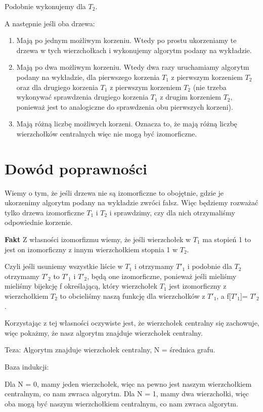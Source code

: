 \documentclass[12pt,a4paper]{article}
\begin{document}
Podobnie wykonujemy dla $T_2$.

A następnie jeśli oba drzewa:
\begin{enumerate}
    \item Mają po jednym możliwym korzeniu.
    Wtedy po prostu ukorzeniamy te drzewa w tych wierzchołkach i wykonujemy algorytm podany na wykładzie.
    \item Mają po dwa możliwym korzeniu.
    Wtedy dwa razy uruchamiamy algorytm podany na wykładzie, dla pierwszego korzenia $T_1$ z pierwszym korzeniem $T_2$ oraz dla drugiego korzenia $T_1$ z pierwszym korzeniem $T_2$ (nie trzeba wykonywać sprawdzenia drugiego korzenia $T_1$ z drugim korzeniem $T_2$, ponieważ jest to analogiczne do sprawdzenia obu pierwszych korzeni).
    \item Mają różną liczbę możliwych korzeni.
    Oznacza to, że mają różną liczbę wierzchołków centralnych więc nie mogą być izomorficzne.
\end{enumerate} 
\section{Dowód poprawności}
Wiemy o tym, że jeśli drzewa nie są izomorficzne to obojętnie, gdzie je ukorzenimy algorytm podany na wykładzie zwróci fałsz. Więc będziemy rozważać tylko drzewa izomorficzne $T_1$ i $T_2$ i sprawdzimy, czy dla nich otrzymaliśmy odpowiednie korzenie.

\textbf{Fakt} Z własności izomorfizmu wiemy, że jeśli wierzchołek w $T_1$ ma stopień 1 to jest on izomorficzny z innym wierzchołkiem stopnia 1 w $T_2$. 

Czyli jeśli usuniemy wszystkie liście w $T_1$ i otrzymamy $T'_1$ i podobnie dla $T_2$ otrzymamy $T'_2$ to $T'_1$ i $T'_2$, będą one izomorficzne, ponieważ jeśli mieliśmy mieliśmy bijekcję f określającą, który wierzchołek $T_1$ jest izomorficzny z wierzchołkiem $T_2$ to obcieliśmy naszą funkcję dla wierzchołków z $T'_1$, a f[$T'_1$]= $T'_2$.

Korzystając z tej własności oczywiste jest, że wierzchołek centralny się zachowuje, więc pokażmy, że nasz algorytm znajduje wierzchołek centralny.

Teza: Algorytm znajduje wierzchołek centralny, N = średnica grafu.

Baza indukcji:

Dla N = 0, mamy jeden wierzchołek, więc na pewno jest naszym wierzchołkiem centralnym, co nam zwraca algorytm.
Dla N = 1, mamy dwa wierzchołki, więc oba mogą być naszym wierzchołkiem centralnym, co nam zwraca algorytm. 
\end{document}
